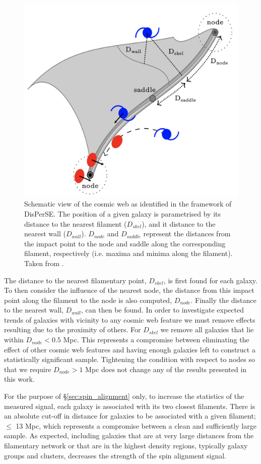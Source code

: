 \begin{figure}
    \centering
	\includegraphics[width=0.5\linewidth]{thesis/latex/cw_spin/cw_disperse_diagram.png}
    \caption{Schematic view of the cosmic web as identified in the framework of DisPerSE. The position of a given galaxy is parametrised by its distance to the nearest filament ($D_{skel}$), and it distance to the nearest wall ($D_{wall}$). $D_{node}$ and $D_{saddle}$ represent the distances from the impact point to the node and saddle along the corresponding filament, respectively (i.e. maxima and minima along the filament). Taken from \citet{kraljic2018}.}
    \label{fig:disperse_schematic}
\end{figure}

The distance to the nearest filamentary point, $D_{skel}$, is first found for each galaxy. To then consider the influence of the nearest node, the distance from this impact point along the filament to the node is also computed, $D_{node}$. Finally the distance to the nearest wall, $D_{wall}$, can then be found. In order to investigate expected trends of galaxies with vicinity to any cosmic web feature we must remove effects resulting due to the proximity of others. For $D_{skel}$ we remove all galaxies that lie within $D_{node} < 0.5$ Mpc. This represents a compromise between eliminating the effect of other cosmic web features and having enough galaxies left to construct a statistically significant sample. Tightening the condition with respect to nodes so that we require $D_{node} > 1$ Mpc does not change any of the results presented in this work. 

For the purpose of \S\ref{sec:spin_alignment} only, to increase the statistics of the measured signal, each galaxy is associated with its two closest filaments. There is an absolute cut-off in distance for galaxies to be associated with a given filament; $\leq$ 13 Mpc, which represents a compromise between a clean and sufficiently large sample. As expected, including galaxies that are at very large distances from the filamentary network or that are in the highest density regions, typically galaxy groups and clusters, decreases the strength of the spin alignment signal.

